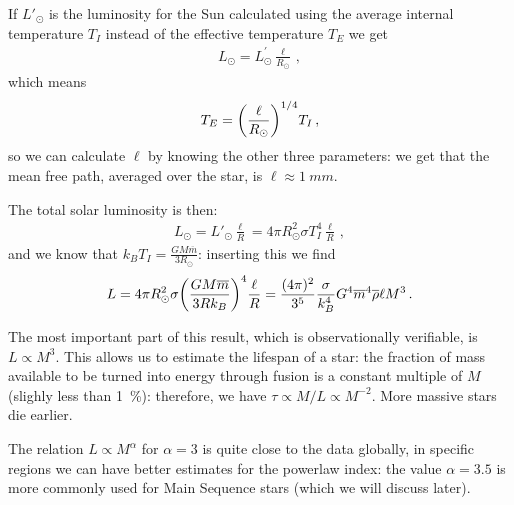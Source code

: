 \documentclass[main.tex]{subfiles}
\begin{document}

If \(L' _{\odot}\) is the luminosity for the Sun calculated using the average internal temperature \(T_I\) instead of the effective temperature \(T_E\) we get
%
\begin{align}
  L _{\odot} = L _{\odot}^{\prime } \frac{\ell}{R _{\odot}}
\,,
\end{align}
%
which means 
%
\begin{align}
  T_E = \qty(\frac{\ell}{R _{\odot}})^{1/4} T_I
\,,
\end{align}
%
so we can calculate \(\ell\) by knowing the other three parameters:
we get that the mean free path, averaged over the star, is \(\ell \approx \SI{1}{mm}\).

The total solar luminosity is then:
%
\begin{align}
  L_{\odot} = L'_{\odot} \frac{\ell}{R} = 4 \pi R _{\odot}^2 \sigma T_I^{4} \frac{\ell}{R}
\,,
\end{align}
%
and we know that \(k_B T_I = \frac{GM \overline{m}}{3 R_{\odot}}\): inserting this we find 
%
\begin{align}
  L = 4 \pi R^2 _{\odot}\sigma  \qty(\frac{GM \overline{m}}{3 R k_B})^{4} \frac{\ell}{R}
  = \frac{(4 \pi )^2}{3^{5}} \frac{\sigma }{k_B^4} G^{4} \overline{m}^{4} \overline{\rho} \ell M^3  
\,.
\end{align}

The most important part of this result, which is observationally verifiable, is \(L \propto M^{3}\). 
This allows us to estimate the lifespan of a star: the fraction of mass available to be turned into energy through fusion is a constant multiple of \(M\) (slighly less than \SI{1}{\percent}): therefore, we have \(\tau \propto M/L \propto M^{-2}\). 
More massive stars die earlier.

The relation \(L \propto M^{\alpha } \) for \(\alpha = 3\) is quite close to the data globally, in specific regions we can have better estimates for the powerlaw index: the value \(\alpha = 3.5\) is more commonly used for Main Sequence stars (which we will discuss later). 
\end{document}
